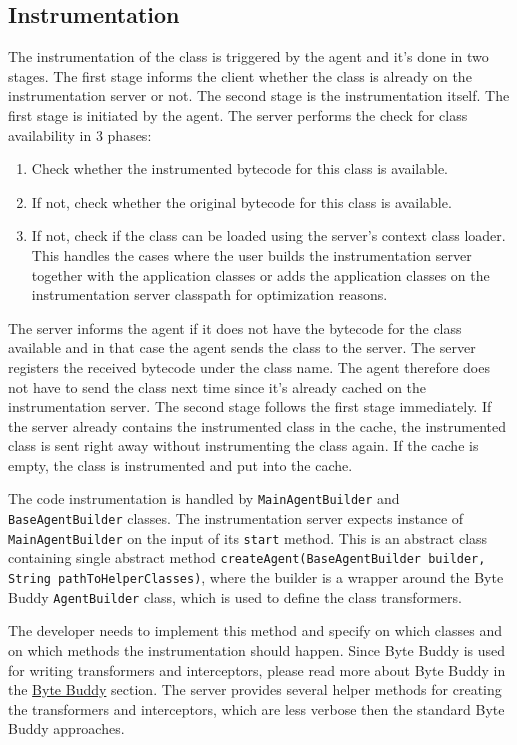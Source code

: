 \subsection{Instrumentation}
The instrumentation of the class is triggered by the agent and it's done in two stages. The first stage informs the client whether the class is already on the instrumentation server or not. The second stage is the instrumentation itself. The first stage is initiated by the agent. The server performs the check for class availability in 3 phases:
\begin{enumerate}
	\item Check whether the instrumented bytecode for this class is available.
	\item If not, check whether the original bytecode for this class is available.
	\item If not, check if the class can be loaded using the server's context class loader. This handles the cases where the user builds the instrumentation server together with the application classes or adds the application classes on the instrumentation server classpath for optimization reasons.
\end{enumerate}

The server informs the agent if it does not have the bytecode for the class available and in that case  the agent sends the class to the server. The server registers the received bytecode under the class name. The agent therefore does not have to send the class next time since it's already cached on the instrumentation server.
The second stage follows the first stage immediately. If the server already contains the instrumented class in the cache, the instrumented class is sent right away without instrumenting the class again. If the cache is empty, the class is instrumented and put into the cache.

The code instrumentation is handled by \texttt{MainAgentBuilder} and \texttt{BaseAgentBuilder} classes.
The instrumentation server expects instance of \texttt{MainAgentBuilder} on the input of its \texttt{start} method. This is an abstract class containing single abstract method \texttt{createAgent(BaseAgentBuilder builder, String pathToHelperClasses)}, where the builder is a wrapper around the Byte Buddy \texttt{AgentBuilder} class, which is used to define the class transformers.

The developer needs to implement this method and specify on which classes and on which methods the instrumentation should happen. Since Byte Buddy is used for writing transformers and interceptors, please read more about Byte Buddy in the \hyperref[sec:byte_buddy]{Byte Buddy} section. The server provides several helper methods for creating the transformers and interceptors, which are less verbose then the standard Byte Buddy approaches.

